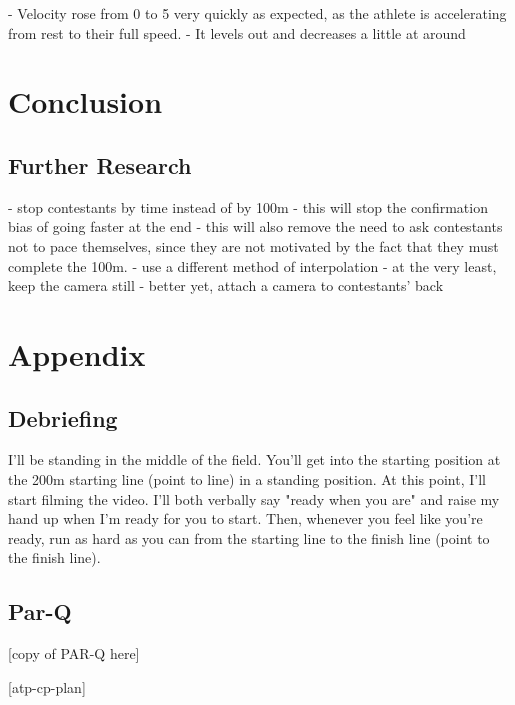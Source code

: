 \documentclass[index]{subfiles}
\begin{document}
- Velocity rose from 0 to 5 very quickly as expected, as the athlete is accelerating from rest to their full speed.
- It levels out and decreases a little at around

\section{Conclusion}
\subsection{Further Research}
- stop contestants by time instead of by 100m
- this will stop the confirmation bias of going faster at the end
- this will also remove the need to ask contestants not to pace themselves, since they are not motivated by the fact that they must complete the 100m.
- use a different method of interpolation
- at the very least, keep the camera still
- better yet, attach a camera to contestants' back

\section{Appendix}
\subsection{Debriefing}
I'll be standing in the middle of the field. You'll get into the starting position at the 200m starting line (point to line) in a standing position. At this point, I'll start filming the video. I'll both verbally say "ready when you are" and raise my hand up when I'm ready for you to start. Then, whenever you feel like you're ready, run as hard as you can from the starting line to the finish line (point to the finish line).
\subsection{Par-Q}
[copy of PAR-Q here]

[atp-cp-plan]

\raggedright{}
\printbibliography[heading=bibintoc]
\end{document}
